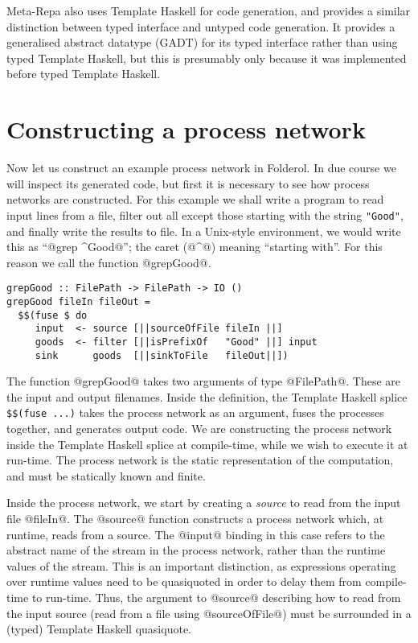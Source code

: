 Meta-Repa \cite{ankner2013edsl} also uses Template Haskell for code generation, and provides a similar distinction between typed interface and untyped code generation.
It provides a generalised abstract datatype (GADT) for its typed interface rather than using typed Template Haskell, but this is presumably only because it was implemented before typed Template Haskell.

\section{Constructing a process network}

Now let us construct an example process network in Folderol.
In due course we will inspect its generated code, but first it is necessary to see how process networks are constructed.
For this example we shall write a program to read input lines from a file, filter out all except those starting with the string \lstinline/"Good"/, and finally write the results to file.
In a Unix-style environment, we would write this as ``@grep ^Good@''; the caret (@^@) meaning ``starting with''.
For this reason we call the function @grepGood@.

\begin{lstlisting}
grepGood :: FilePath -> FilePath -> IO ()
grepGood fileIn fileOut =
  $$(fuse $ do
     input  <- source [||sourceOfFile fileIn ||]
     goods  <- filter [||isPrefixOf   "Good" ||] input
     sink      goods  [||sinkToFile   fileOut||])
\end{lstlisting}

The function @grepGood@ takes two arguments of type @FilePath@.
These are the input and output filenames.
Inside the definition, the Template Haskell splice \lstinline/$$(fuse ...)/ takes the process network as an argument, fuses the processes together, and generates output code.
We are constructing the process network inside the Template Haskell splice at compile-time, while we wish to execute it at run-time.
The process network is the static representation of the computation, and must be statically known and finite.

Inside the process network, we start by creating a \emph{source} to read from the input file @fileIn@.
The @source@ function constructs a process network which, at runtime, reads from a source.
The @input@ binding in this case refers to the abstract name of the stream in the process network, rather than the runtime values of the stream.
This is an important distinction, as expressions operating over runtime values need to be quasiquoted in order to delay them from compile-time to run-time.
Thus, the argument to @source@ describing how to read from the input source (read from a file using @sourceOfFile@) must be surrounded in a (typed) Template Haskell quasiquote.

